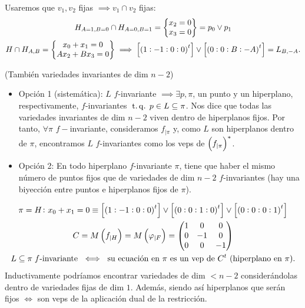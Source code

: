 \begin{example}
\begin{itemize}
        Usaremos que $v_1, v_2$ fijas $\implies v_1 \cap v_2$ fijas:
        \begin{gather*}
            H_{A=1,B=0} \cap H_{A=0,B=1} = \begin{Bmatrix}
                x_2 = 0 \\
                x_3 = 0
            \end{Bmatrix} = p_0 \vee p_1 \\
            H \cap H_{A,B} = \begin{Bmatrix}
                x_0 + x_1 = 0 \\
                Ax_2 + Bx_3 = 0
            \end{Bmatrix} \implies \left[\left(1:-1:0:0\right)^t\right] \vee \left[\left(0:0:B:-A\right)^t\right] = L_{B,-A}.
        \end{gather*}
    \end{itemize}
\end{example}
\begin{obs}
    (También variedades invariantes de dim $n-2$)
    \begin{itemize}
        \item Opción 1 (sistemática): $L$ $f$-invariante $\implies 
        \exists p,\pi$, un punto y un hiperplano, respectivamente, 
        $f$-invariantes $\operatorname{\;t.q.\;} p\in L\subseteq\pi$. Nos dice que todas 
        las variedades invariantes de dim $n-2$ viven dentro de hiperplanos fijos. 
        Por tanto, $\forall \pi$ $f-$invariante, consideramos 
        $f_{|\pi}$ y, como $L$ son hiperplanos dentro de $\pi$, 
        encontramos $L$ $f$-invariantes como los veps de 
        $\left( f_{|\pi}\right)^*$.
        \item Opción 2: En todo hiperplano $f$-invariante $\pi$, 
        tiene que haber el mismo número de puntos fijos que de 
        variedades de dim $n-2$ $f$-invariantes (hay una biyección 
        entre puntos e hiperplanos fijos de $\pi$).
    \end{itemize}
\end{obs}
\begin{example}
    \begin{gather*}
        \pi = H \colon x_0 + x_1 = 0 \equiv \left[\left(1:-1:0:0\right)^t\right] \vee \left[\left(0:0:1:0\right)^t\right] \vee \left[\left(0:0:0:1\right)^t\right] \\
        C = M\left( f_{|H}\right) = M\left(\varphi_{|F}\right) =
        \begin{pmatrix}
            1 & 0 & 0 \\
            0 & -1 & 0 \\
            0 & 0 & -1
        \end{pmatrix} \\
        L \subseteq \pi\;f\text{-invariante }\iff\text{ su ecuación en }\pi\text{ es un vep de }C^t\text{ (hiperplano en }\pi\text{).}
    \end{gather*}
    Inductivamente podríamos encontrar variedades de dim $< n-2$ considerándolas dentro de variedades fijas de dim $1$. Además, siendo así hiperplanos que serán fijos $\iff$ son veps de la aplicación dual de la restricción.
\end{example}
